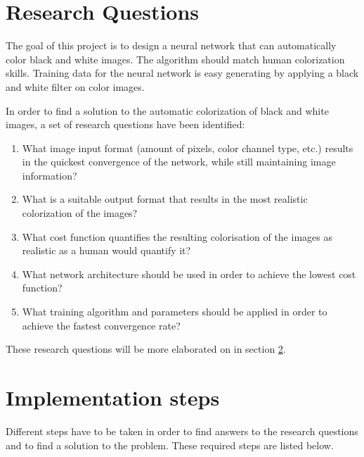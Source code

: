 \section{Research Questions}

The goal of this project is to design a neural network that can automatically color black and white images. The algorithm should match human colorization skills. Training data for the neural network is easy generating by applying a black and white filter on color images. 

In order to find a solution to the automatic colorization of black and white images, a set of research questions have been identified:

\begin{enumerate}
	\item {What image input format (amount of pixels, color channel type, etc.) results in the quickest convergence of the network, while still maintaining image information?} 
	\item {What is a suitable output format that results in the most realistic colorization of the images?}
	\item {What cost function quantifies the resulting colorisation of the images as realistic as a human would quantify it?}
	\item {What network architecture should be used in order to achieve the lowest cost function?}
	\item {What training algorithm and parameters should be applied in order to achieve the fastest convergence rate?}
\end{enumerate}

These research questions will be more elaborated on in section \ref{sec:imsteps}.

\section{Implementation steps}
\label{sec:imsteps}
	
Different steps have to be taken in order to find answers to the research questions and to find a solution to the problem. These required steps are listed below.

